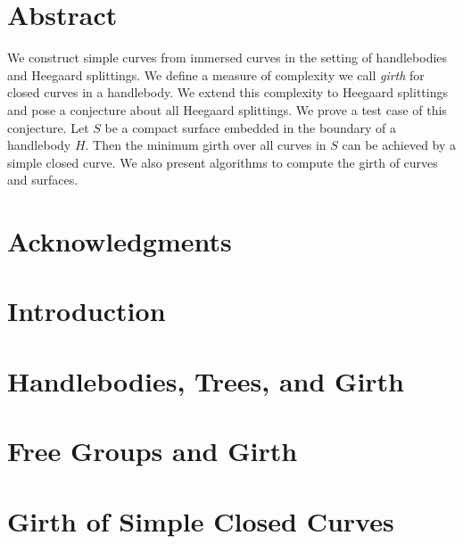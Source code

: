\documentclass[12pt, oneside]{amsart}
\begin{document}

\renewcommand{\baselinestretch}{1.6}\small\normalsize


\newpage
\setcounter{tocdepth}{1}
\tableofcontents


\newpage
\section*{Abstract}

We construct simple curves from immersed 
curves in the setting of handlebodies and Heegaard splittings.
We define a measure of complexity we call \emph{girth} for 
closed curves in a handlebody.
We extend this complexity to Heegaard splittings and pose 
a conjecture about all Heegaard splittings.
We prove a test case of this conjecture.
Let $S$ be a compact surface embedded in the boundary of 
a handlebody $H$.  Then the minimum girth over all curves in $S$
can be achieved by a simple closed curve.
We also present algorithms to compute the girth of curves
and surfaces.


\newpage
\section*{Acknowledgments}



\newpage
\pagestyle{headings}
\markright{}

\section{Introduction}
\label{introduction}


\section{Handlebodies, Trees, and Girth}
\label{trees}


\section{Free Groups and Girth}
\label{free groups}


\section{Girth of Simple Closed Curves}
\label{handlebodygirth}

\end{document}
